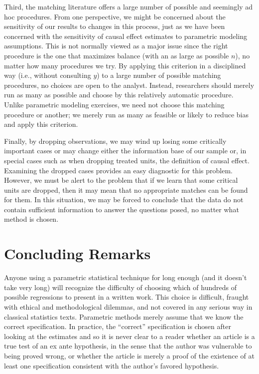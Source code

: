 \documentclass[11pt,titlepage]{article}
\begin{document}
Third, the matching literature offers a large number of possible and
seemingly ad hoc procedures.  From one perspective, we might be
concerned about the sensitivity of our results to changes in this
process, just as we have been concerned with the sensitivity of causal
effect estimates to parametric modeling assumptions.  This is not
normally viewed as a major issue since the right procedure is the one
that maximizes balance (with an as large as possible $n$), no matter
how many procedures we try.  By applying this criterion in a
disciplined way (i.e., without consulting $y$) to a large number of
possible matching procedures, no choices are open to the analyst.
Instead, researchers should merely run as many as possible and choose
by this relatively automatic procedure.  Unlike parametric modeling
exercises, we need not choose this matching procedure or another; we
merely run as many as feasible or likely to reduce bias and apply this
criterion.

Finally, by dropping observations, we may wind up losing some
critically important cases or may change either the information base
of our sample or, in special cases such as when dropping treated
units, the definition of causal effect.  Examining the dropped cases
provides an easy diagnostic for this problem.  However, we must be
alert to the problem that if we learn that some critical units are
dropped, then it may mean that no appropriate matches can be found for
them.  In this situation, we may be forced to conclude that the data
do not contain sufficient information to answer the questions posed,
no matter what method is chosen.

\section{Concluding Remarks}

Anyone using a parametric statistical technique for long enough (and
it doesn't take very long) will recognize the difficulty of choosing
which of hundreds of possible regressions to present in a written
work.  This choice is difficult, fraught with ethical and
methodological dilemmas, and not covered in any serious way in
classical statistics texts.  Parametric methods merely assume that we
know the correct specification.  In practice, the ``correct''
specification is chosen after looking at the estimates and so it is
never clear to a reader whether an article is a true test of an ex
ante hypothesis, in the sense that the author was vulnerable to being
proved wrong, or whether the article is merely a proof of the
existence of at least one specification consistent with the author's
favored hypothesis.
\end{document}
